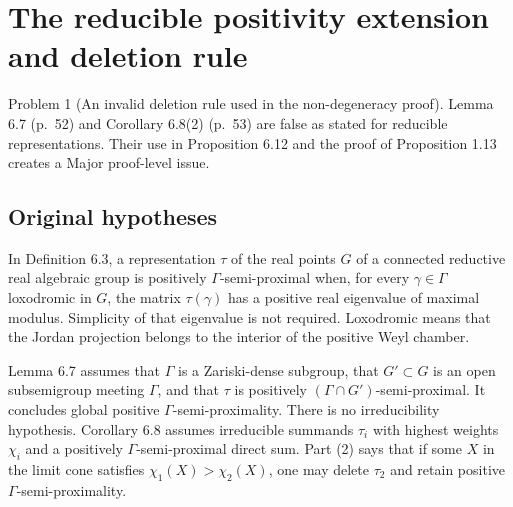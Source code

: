 \documentclass[10pt]{article}
\begin{document}
\section*{The reducible positivity extension and deletion rule}
Problem 1 (An invalid deletion rule used in the non-degeneracy proof).  Lemma 6.7 (p. 52) and Corollary 6.8(2) (p. 53) are false as stated for reducible representations. Their use in Proposition 6.12 and the proof of Proposition 1.13 creates a Major proof-level issue.\par
\subsection*{Original hypotheses}
In Definition 6.3, a representation \(\tau\) of the real points \(G\) of a connected reductive real algebraic group is positively \(\Gamma\)-semi-proximal when, for every \(\gamma\in\Gamma\) loxodromic in \(G\), the matrix \(\tau(\gamma)\) has a positive real eigenvalue of maximal modulus. Simplicity of that eigenvalue is not required. Loxodromic means that the Jordan projection belongs to the interior of the positive Weyl chamber.\par
Lemma 6.7 assumes that \(\Gamma\) is a Zariski-dense subgroup, that \(G'\subset G\) is an open subsemigroup meeting \(\Gamma\), and that \(\tau\) is positively \((\Gamma\cap G')\)-semi-proximal. It concludes global positive \(\Gamma\)-semi-proximality. There is no irreducibility hypothesis. Corollary 6.8 assumes irreducible summands \(\tau_i\) with highest weights \(\chi_i\) and a positively \(\Gamma\)-semi-proximal direct sum. Part (2) says that if some \(X\) in the limit cone satisfies \(\chi_1(X)>\chi_2(X)\), one may delete \(\tau_2\) and retain positive \(\Gamma\)-semi-proximality.\par
\end{document}

